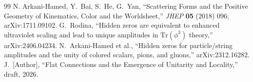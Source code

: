 \documentclass[11pt]{article}
\theoremstyle{definition}
\newcommand{\Tr}{\mathrm{Tr}}
\begin{document}
\begin{thebibliography}{99}
 N. Arkani-Hamed, Y.~Bai, S.~He, G.~Yan, ``Scattering Forms and the Positive Geometry of Kinematics, Color and the Worldsheet,'' \emph{JHEP} \textbf{05} (2018) 096; arXiv:1711.09102.
 G.~Rodina, ``Hidden zeros are equivalent to enhanced ultraviolet scaling and lead to unique amplitudes in $\Tr(\phi^3)$ theory,'' arXiv:2406.04234.
 N.~Arkani-Hamed et al., ``Hidden zeros for particle/string amplitudes and the unity of colored scalars, pions, and gluons,'' arXiv:2312.16282.
 J.~[Author], ``Flat Connections and the Emergence of Unitarity and Locality,'' draft, 2026.
\end{thebibliography}
\end{document}
